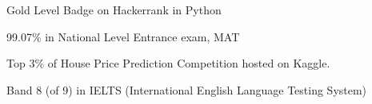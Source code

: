 


\begin{cventries}


\cventry
{} %
{} %
{} %
{} %
{ %
\begin{cvitems}
\item {Gold Level Badge on Hackerrank in Python}
\item {99.07\% in National Level Entrance exam, MAT}
\item {Top 3\% of House Price Prediction Competition hosted on Kaggle.}
\item {Band 8 (of 9) in IELTS (International English Language Testing System)}
\end{cvitems}
}




\end{cventries}

